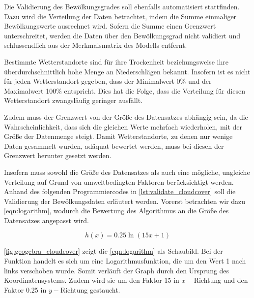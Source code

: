 \documentclass[12pt, a4paper]{article}
\begin{document}
Die Validierung des Bewölkungsgrades soll ebenfalls automatisiert stattfinden. Dazu wird die Verteilung der Daten betrachtet, indem die Summe einmaliger Bewölkungswerte ausrechnet wird. Sofern die Summe einen Grenzwert unterschreitet, werden die Daten über den Bewölkungsgrad nicht validiert und schlussendlich aus der Merkmalsmatrix des Modells entfernt. 

Bestimmte Wetterstandorte sind für ihre Trockenheit beziehungsweise ihre überdurchschnittlich hohe Menge an Niederschlägen bekannt. Insofern ist es nicht für jeden Wetterstandort gegeben, dass der Minimalwert 0\% und der Maximalwert 100\% entspricht. Dies hat die Folge, dass die Verteilung für diesen Wetterstandort zwangsläufig geringer ausfällt.

Zudem muss der Grenzwert von der Größe des Datensatzes abhängig sein, da die Wahrscheinlichkeit, dass sich die gleichen Werte mehrfach wiederholen, mit der Größe der Datenmenge steigt.  Damit Wetterstandorte, zu denen nur wenige Daten gesammelt wurden, adäquat bewertet werden, muss bei diesen der Grenzwert herunter gesetzt werden. 
 

Insofern muss sowohl die Größe des Datensatzes als auch eine mögliche, ungleiche Verteilung auf Grund von umweltbedingten Faktoren berücksichtigt werden. Anhand des folgenden Programmiercodes in \autoref{lst:validate_cloudcover} soll die Validierung der Bewölkungsdaten erläutert werden. Vorerst betrachten wir dazu \autoref{eqn:logarithm}, wodurch die Bewertung des Algorithmus an die Größe des Datensatzes angepasst wird.

\begin{equation}
\label{eqn:logarithm}
h(x)=0.25\ln(15x+1)
\end{equation}

\autoref{fig:geogebra_cloudcover} zeigt die \autoref{eqn:logarithm} als Schaubild. Bei der Funktion handelt es sich um eine Logarithmusfunktion, die um den Wert 1 nach links verschoben wurde. Somit verläuft der Graph durch den Ursprung des Koordinatensystems. Zudem wird sie um den Faktor 15 in $x-$Richtung und den Faktor 0.25 in $y-$Richtung gestaucht.
\end{document}
